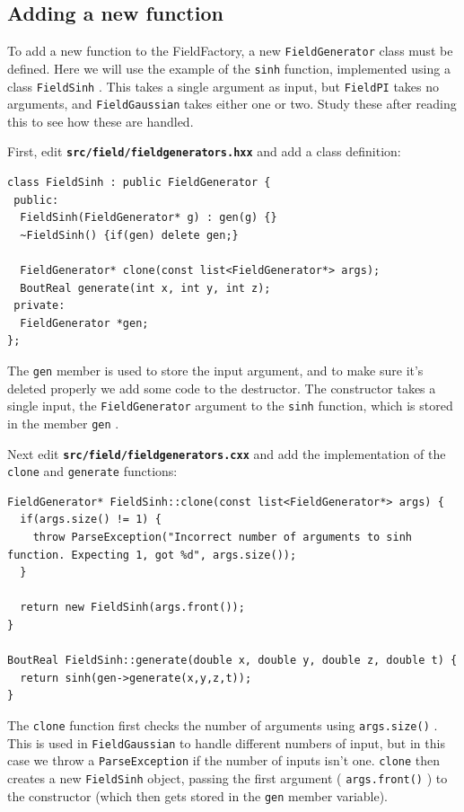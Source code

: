 \documentclass[12pt]{article}
\newcommand{\file}[1]{\texttt{\bf #1}}
\begin{document}
\subsection{Adding a new function}
%
To add a new function to the FieldFactory, a new
%
\lstinline!FieldGenerator!
%
 class must be defined. Here we will use the example of the
%
\lstinline!sinh!
%
 function, implemented using a class
%
\lstinline!FieldSinh!
%
. This takes a single argument as input, but
%
\lstinline!FieldPI! takes no arguments, and \lstinline!FieldGaussian!
%
 takes either one or two.  Study these after reading this to see how these are
 handled.

First, edit \file{src/field/fieldgenerators.hxx} and add a class definition:
%
\begin{lstlisting}[firstnumber=114]
class FieldSinh : public FieldGenerator {
 public:
  FieldSinh(FieldGenerator* g) : gen(g) {}
  ~FieldSinh() {if(gen) delete gen;}

  FieldGenerator* clone(const list<FieldGenerator*> args);
  BoutReal generate(int x, int y, int z);
 private:
  FieldGenerator *gen;
};
\end{lstlisting}
%
The
%
\lstinline!gen!
%
 member is used to store the input argument, and to make sure it's deleted
 properly we add some code to the destructor. The constructor takes a single
 input, the
%
\lstinline!FieldGenerator! argument to the \lstinline!sinh!
%
 function, which is stored in the member
%
\lstinline!gen!
%
.

Next edit \file{src/field/fieldgenerators.cxx} and add the implementation of
the
%
\lstinline!clone!
%
 and
%
\lstinline!generate!
%
 functions:
%
\begin{lstlisting}[firstnumber=33]
FieldGenerator* FieldSinh::clone(const list<FieldGenerator*> args) {
  if(args.size() != 1) {
    throw ParseException("Incorrect number of arguments to sinh function. Expecting 1, got %d", args.size());
  }

  return new FieldSinh(args.front());
}

BoutReal FieldSinh::generate(double x, double y, double z, double t) {
  return sinh(gen->generate(x,y,z,t));
}
\end{lstlisting}
%
The
%
\lstinline!clone!
%
 function first checks the number of arguments using
%
\lstinline!args.size()!
%
. This is used in
%
\lstinline!FieldGaussian!
%
 to handle different numbers of input, but in this case we throw a
%
\lstinline!ParseException!
%
if the number of inputs isn't one.
%
\lstinline!clone!
%
 then creates a new
%
\lstinline!FieldSinh!
%
 object, passing the first argument (
%
\lstinline!args.front()!
%
) to the constructor (which then gets stored in the
%
\lstinline!gen!
%
 member variable).
\end{document}
